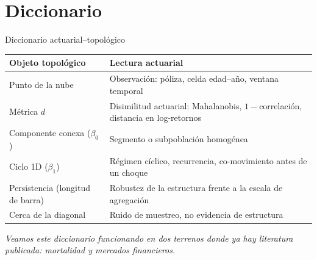 \documentclass[aspectratio=169,11pt]{beamer}
\begin{document}
\section{Diccionario}
\begin{frame}{Diccionario actuarial--topológico}
  \begin{center}
  \small
  \begin{tabular}{@{}p{4.7cm}p{6.8cm}@{}}
    \toprule
    \textbf{Objeto topológico} & \textbf{Lectura actuarial} \\
    \midrule
    Punto de la nube & Observación: póliza, celda edad--año, ventana temporal \\
    Métrica $d$ & Disimilitud actuarial: Mahalanobis, $1-$correlación, distancia en log-retornos \\
    Componente conexa ($\beta_0$) & Segmento o subpoblación homogénea \\
    Ciclo 1D ($\beta_1$) & Régimen cíclico, recurrencia, co-movimiento antes de un choque \\
    Persistencia (longitud de barra) & Robustez de la estructura frente a la escala de agregación \\
    Cerca de la diagonal & Ruido de muestreo, no evidencia de estructura \\
    \bottomrule
  \end{tabular}
  \end{center}
  \vspace{0.8em}
  \begin{center}
  {\small\itshape\color{muted}
  Veamos este diccionario funcionando en dos terrenos donde ya hay
  literatura publicada: mortalidad y mercados financieros.}
  \end{center}
\end{frame}

\end{document}
